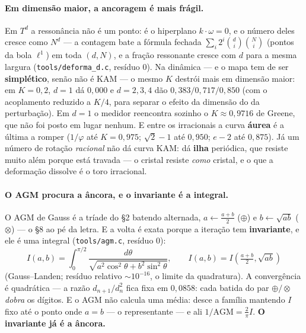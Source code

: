 \documentclass[11pt]{article}
\newcommand{\code}[1]{\texttt{\small #1}}
\theoremstyle{plain}
\theoremstyle{remark}
\begin{document}
\paragraph{Em dimensão maior, a ancoragem é mais frágil.} Em $T^d$ a ressonância não é um ponto: é o
hiperplano $k\cdot\omega=0$, e o número deles cresce como $N^d$ --- a contagem bate a fórmula fechada
$\sum_i2^i\binom{d}{i}\binom{N}{i}$ (pontos da bola $\ell^1$) em toda $(d,N)$, e a fração ressonante
cresce com $d$ para a mesma largura (\code{tools/deforma\_d.c}, resíduo $0$). Na dinâmica --- e o mapa
tem de ser \textbf{simplético}, senão não é KAM --- o mesmo $K$ destrói mais em dimensão maior: em
$K=0{,}2$, $d=1$ dá $0{,}000$ e $d=2,3,4$ dão $0{,}383/0{,}717/0{,}850$ (com o acoplamento reduzido a
$K/4$, para separar o efeito da dimensão do da perturbação). Em $d=1$ o medidor reencontra sozinho o
$K\approx0{,}9716$ de Greene, que não foi posto em lugar nenhum. E entre os irracionais a curva
\textbf{áurea} é a última a romper ($1/\varphi$ até $K=0{,}975$; $\sqrt2-1$ até $0{,}950$; $e-2$ até
$0{,}875$). Já um número de rotação \emph{racional} não dá curva KAM: dá \textbf{ilha} periódica, que
resiste muito além porque está travada --- o cristal resiste \emph{como} cristal, e o que a deformação
dissolve é o toro irracional.

\paragraph{O AGM procura a âncora, e o invariante é a integral.} O AGM de Gauss é a tríade do §2
batendo alternada, $a\leftarrow\frac{a+b}{2}$ ($\oplus$) e $b\leftarrow\sqrt{ab}$ ($\otimes$) --- o §8
ao pé da letra. E a volta é exata porque a iteração tem \textbf{invariante}, e ele é uma integral
(\code{tools/agm.c}, resíduo $0$):
\[
 I(a,b)=\int_0^{\pi/2}\frac{d\theta}{\sqrt{a^2\cos^2\theta+b^2\sin^2\theta}},
 \qquad I(a,b)=I\!\left(\tfrac{a+b}{2},\sqrt{ab}\right)
\]
(Gauss--Landen; resíduo relativo $\sim10^{-16}$, o limite da quadratura). A convergência é
quadrática --- a razão $d_{n+1}/d_n^2$ fica fixa em $0{,}0858$: cada batida do par $\oplus/\otimes$
\emph{dobra} os dígitos. E o AGM não calcula uma média: desce a família mantendo $I$ fixo até o ponto
onde $a=b$ --- o representante --- e ali $1/\mathrm{AGM}=\frac{2}{\pi}I$. \textbf{O invariante já é a
âncora.}
\end{document}
